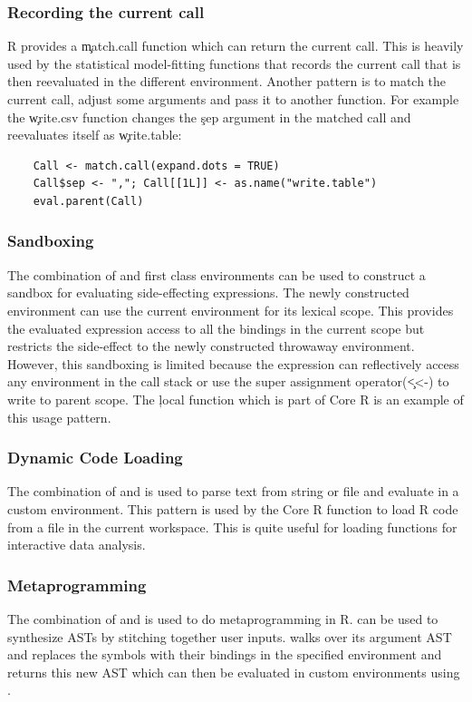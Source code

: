 \documentclass[conference]{IEEEtran}
\begin{document}
\subsubsection{Recording the current call} R provides a \c{match.call} function
which can return the current call. This is heavily used by the statistical
model-fitting functions that records the current call that is then reevaluated
in the different environment. Another pattern is to match the current call,
adjust some arguments and pass it to another function. For example the
\c{write.csv} function changes the \c{sep} argument in the matched call and reevaluates itself as \c{write.table}:
%
\begin{lstlisting}
    Call <- match.call(expand.dots = TRUE)
    Call$sep <- ","; Call[[1L]] <- as.name("write.table")
    eval.parent(Call)
\end{lstlisting}

  \subsubsection{Sandboxing} The combination of \eval and first class
  environments can be used to construct a sandbox for evaluating side-effecting
  expressions. The newly constructed environment can use the current environment
  for its lexical scope. This provides the evaluated expression access to all the
  bindings in the current scope but restricts the side-effect to the newly
  constructed throwaway environment. However, this sandboxing is limited because
  the expression can reflectively access any environment in the call stack or use
  the super assignment operator(\c{<<-}) to write to parent scope. The \c{local}
  function which is part of Core R is an example of this usage pattern.

  \subsubsection{Dynamic Code Loading} The combination of \parse and \eval is
  used to parse text from string or file and evaluate in a custom environment.
  This pattern is used by the \source Core R function to load R code from a file
  in the current workspace. This is quite useful for loading functions for
  interactive data analysis.

  \subsubsection{Metaprogramming} The combination of \eval and \substitute is
  used to do metaprogramming in R. \substitute can be used to synthesize ASTs by
  stitching together user inputs. \substitute walks over its argument AST and
  replaces the symbols with their bindings in the specified environment and
  returns this new AST which can then be evaluated in custom environments using
  \eval.
\end{document}
